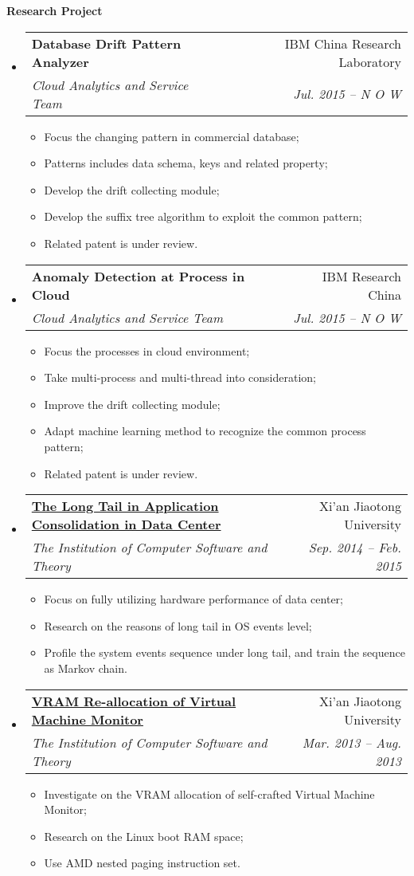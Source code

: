 \documentclass[letterpaper,11pt]{article}
\makeatletter
\newcommand{\resitem}[1]{\item #1 \vspace{-2pt}}
\newcommand{\resheading}[1]{{\large \colorbox{mygrey}{\begin{minipage}{\textwidth}{\textbf{#1 \vphantom{p\^{E}}}}\end{minipage}}}}
\newcommand{\ressubheading}[4]{
\begin{tabular*}{6.5in}{l@{\extracolsep{\fill}}r}
		\textbf{#1} & #2 \\
		\textit{#3} & \textit{#4} \\
\end{tabular*}\vspace{-6pt}}
\makeatother
\begin{document}
\resheading{Research Project}
	\begin{itemize}
		\item 
			\ressubheading{Database Drift Pattern Analyzer}{IBM China Research Laboratory}{Cloud Analytics and Service Team}{Jul. 2015 -- N O W}
				{ \footnotesize
				\begin{itemize}
					\resitem{Focus the changing pattern in commercial database;}
					\resitem{Patterns includes data schema, keys and related property;}
					\resitem{Develop the drift collecting module;}
					\resitem{Develop the suffix tree algorithm to exploit the common pattern;}
					\resitem{Related patent is under review.}
				\end{itemize}
				}
		\item 
			\ressubheading{Anomaly Detection at Process in Cloud}{IBM Research China}{Cloud Analytics and Service Team}{Jul. 2015 -- N O W}
				{ \footnotesize
				\begin{itemize}
					\resitem{Focus the processes in cloud environment;}
					\resitem{Take multi-process and multi-thread into consideration;}
					\resitem{Improve the drift collecting module;}
					\resitem{Adapt machine learning method to recognize the common process pattern;}
					\resitem{Related patent is under review.}
				\end{itemize}
				}
		\item 
			\ressubheading{\href{http://eiegrd.xjtu.edu.cn/}{The Long Tail in Application Consolidation in Data Center}}{Xi'an Jiaotong University}{The Institution of Computer Software and Theory}{Sep. 2014 -- Feb. 2015}
				{ \footnotesize
				\begin{itemize}
					\resitem{Focus on fully utilizing hardware performance of data center;}
					\resitem{Research on the reasons of long tail in OS events level;}
					\resitem{Profile the system events sequence under long tail, and train the sequence as Markov chain.}
				\end{itemize}
				}
		\item 
			\ressubheading{\href{http://eiegrd.xjtu.edu.cn/}{VRAM Re-allocation of Virtual Machine Monitor}}{Xi'an Jiaotong University}{The Institution of Computer Software and Theory}{Mar. 2013 -- Aug. 2013}
				{ \footnotesize
				\begin{itemize}
					\resitem{Investigate on the VRAM allocation of self-crafted Virtual Machine Monitor;}
					\resitem{Research on the Linux boot RAM space;}
					\resitem{Use AMD nested paging instruction set.}
				\end{itemize}
				}
	\end{itemize}
\end{document}
